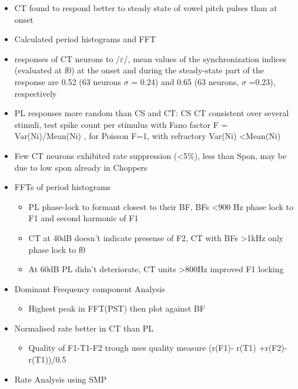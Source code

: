 \documentclass[10pt,a4paper]{article}
\begin{document}
\begin{itemize}
\item CT found to respond better to steady state of vowel pitch pulses than at
  onset
\item Calculated period histograms and FFT
\item responses of CT neurons to /$\varepsilon $/, mean values of the
  synchronization indices (evaluated at f0) at the onset and during the
  steady-state part of the response are 0.52 (63 neurons $\sigma $ = 0.24) and
  0.65 (63 neurons, $\sigma $ =0.23), respectively
\item PL responses more random than CS and CT: CS CT consistent over several
  stimuli, test spike count per stimulus with Fano factor \citep{Teich:1989} F =
  Var(Ni)/Mean(Ni) , for Poisson F=1, with refractory Var(Ni)
  {\textless}Mean(Ni)
\item Few CT neurons exhibited rate suppression ({\textless}5\%), less than
  Spon, may be due to low spon already in Choppers \citep{RhodeGreenberg:1994a}
\item FFTs of period histograms

  \begin{itemize}
  \item PL phase-lock to formant closest to their BF, BFs {\textless}900 Hz
    phase lock to F1 and second harmonic of F1
  \item CT at 40dB doesn{\textquoteright}t indicate presense of F2, CT with BFs
    {\textgreater}1kHz only phase lock to f0
  \item At 60dB PL didn{\textquoteright}t deteriorate, CT units
    {\textgreater}800Hz improved F1 locking
  \end{itemize}
\item Dominant Frequency component Analysis \citep{SinexGeisler:1983}

  \begin{itemize}
  \item Highest peak in FFT(PST) then plot against BF
  \end{itemize}
\item Normalised rate better in CT than PL

  \begin{itemize}
  \item Quality of F1-T1-F2 trough uses quality measure (r(F1)- r(T1)
    +r(F2)-r(T1))/0.5
  \end{itemize}
\item Rate Analysis using SMP


\end{itemize}
\end{document}
